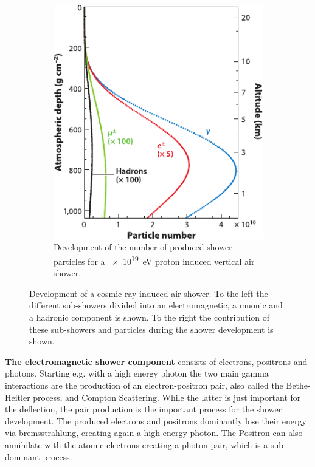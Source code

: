 \begin{figure}
\begin{subfigure}[t]{0.38\textwidth}
        \includegraphics[width=\textwidth]{./images/air_shower_development.pdf}
        \caption{Development of the number of produced shower particles for a \SI{e19}{eV} proton induced vertical air shower. \cite{Engel11EAS}}
        \label{fig:air_shower_development}
    \end{subfigure}
    \caption{Development of a cosmic-ray induced air shower. To the left the different sub-showers divided into an electromagnetic, a muonic and a hadronic component is shown. To the right the contribution of these sub-showers and particles during the shower development is shown.}
    \label{fig:air_shower}
\end{figure}

\textbf{The electromagnetic shower component} consists of electrons, positrons and photons.
Starting e.g. with a high energy photon the two main gamma interactions are the production of an electron-positron pair, also called the Bethe-Heitler process, and Compton Scattering.
While the latter is just important for the deflection, the pair production is the important process for the shower development.
The produced electrons and positrons dominantly lose their energy via bremsstrahlung, creating again a high energy photon.
The Positron can also annihilate with the atomic electrons creating a photon pair, which is a sub-dominant process.

